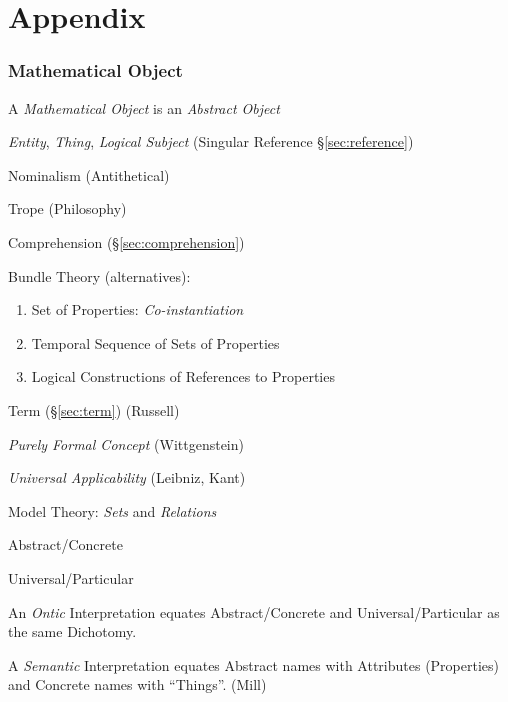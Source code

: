 \part{Appendix}\label{sec:appendix}

\section{Mathematical Object}\label{sec:mathematical_object}
\cite{laycock10}

A \emph{Mathematical Object} is an \emph{Abstract Object}

\emph{Entity}, \emph{Thing}, \emph{Logical Subject} (Singular
Reference \S\ref{sec:reference})

Nominalism (Antithetical)

Trope (Philosophy)

Comprehension (\S\ref{sec:comprehension})

Bundle Theory (alternatives):
\begin{enumerate}
  \item Set of Properties: \emph{Co-instantiation}
  \item Temporal Sequence of Sets of Properties
  \item Logical Constructions of References to Properties
\end{enumerate}

Term (\S\ref{sec:term}) (Russell)

\emph{Purely Formal Concept} (Wittgenstein)

\emph{Universal Applicability} (Leibniz, Kant)

Model Theory: \emph{Sets} and \emph{Relations}

Abstract/Concrete

Universal/Particular

An \emph{Ontic} Interpretation equates Abstract/Concrete and
Universal/Particular as the same Dichotomy.

A \emph{Semantic} Interpretation equates Abstract names with
Attributes (Properties) and Concrete names with ``Things''. (Mill)



